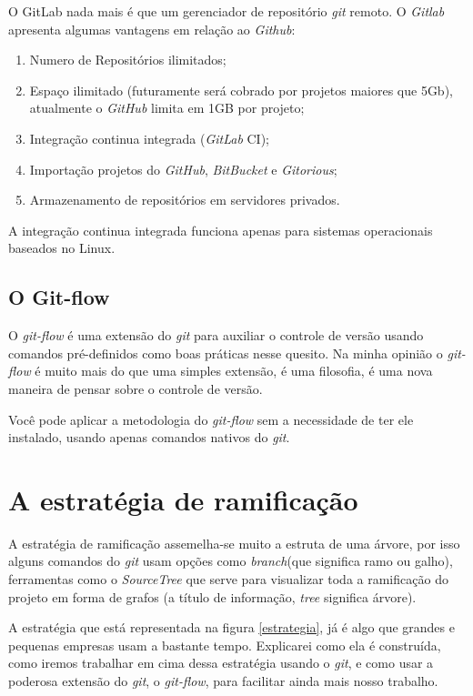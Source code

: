 \documentclass[12pt,openright,oneside,a4paper,english,brazil]{abntex2}
\begin{document}
O GitLab nada mais é que um gerenciador de repositório \textit{git} remoto. O \textit{Gitlab} apresenta algumas vantagens em relação ao \textit{Github}:

\begin{enumerate}
	\item Numero de Repositórios ilimitados;
	\item Espaço ilimitado (futuramente será cobrado por projetos maiores que 5Gb), atualmente o \textit{GitHub} limita em 1GB por projeto;
	\item Integração continua integrada (\textit{GitLab} CI);
	\item Importação projetos do \textit{GitHub}, \textit{BitBucket} e \textit{Gitorious};
	\item Armazenamento de repositórios em servidores privados.
\end{enumerate}

A integração continua integrada funciona apenas para sistemas operacionais baseados no Linux.

\section{O Git-flow}
O \textit{git-flow}  é uma extensão do \textit{git} para auxiliar o controle de versão usando comandos pré-definidos como boas práticas nesse quesito. Na minha opinião o \textit{git-flow}  é muito mais do que uma simples extensão, é uma filosofia, é uma nova maneira de pensar sobre o controle de versão. 

Você pode aplicar a metodologia do \textit{git-flow}  sem a necessidade de ter ele instalado, usando apenas comandos nativos do \textit{git}. 

\chapter{A estratégia de ramificação}
A estratégia de ramificação assemelha-se muito a estruta de uma árvore, por isso alguns comandos do \textit{git} usam opções como \textit{branch}(que significa ramo ou galho), ferramentas como o \textit{SourceTree} que serve para visualizar toda a ramificação do projeto em forma de grafos (a título de informação, \textit{tree} significa árvore).

A estratégia que está representada na figura \ref{estrategia}, já é algo que grandes e pequenas empresas usam a bastante tempo. Explicarei como ela é construída, como iremos trabalhar em cima dessa estratégia usando o \textit{git}, e como usar a poderosa extensão do \textit{git}, o \textit{\textit{git-flow}}, para facilitar ainda mais nosso trabalho. 
\end{document}
